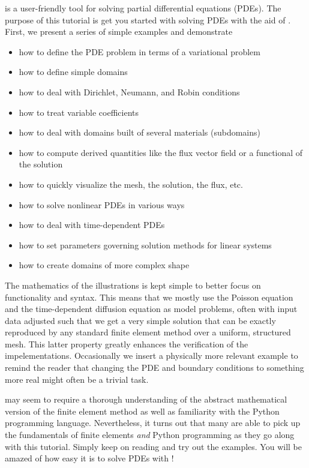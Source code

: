 \fenics{} is a user-friendly tool for solving partial differential
equations (PDEs). The purpose of this tutorial is get you started with
solving PDEs with the aid of \fenics. First, we present a series of
simple examples and demonstrate
\begin{itemize}
\item
how to define the PDE problem in terms of a variational problem
\item
how to define simple domains
\item
how to deal with Dirichlet, Neumann, and Robin conditions
\item
how to treat variable coefficients
\item
how to deal with domains built of several materials (subdomains)
\item
how to compute derived quantities like the flux vector field or
a functional of the solution
\item
how to quickly visualize the mesh, the solution, the flux, etc.
\item
how to solve nonlinear PDEs in various ways
\item
how to deal with time-dependent PDEs
\item
how to set parameters governing solution methods for linear systems
\item
how to create domains of more complex shape
\end{itemize}
The mathematics of the illustrations is kept simple to better focus
on \fenics{} functionality and syntax. This means that we mostly use
the Poisson equation and the time-dependent diffusion equation
as model problems, often with input data adjusted such that we get
a very simple solution that can be exactly reproduced by any standard
finite element method over a uniform, structured mesh. This
latter property greatly enhances the verification of the impelementations.
Occasionally we insert a physically more relevant example
to remind the reader that changing the PDE and boundary
conditions to something more real might often be a trivial task.


\fenics{} may seem to require a thorough understanding of the abstract
mathematical version of the finite element method as well as
familiarity with the Python programming language.  Nevertheless, it
turns out that many are able to pick up the fundamentals of finite
elements \emph{and} Python programming as they go along with this
tutorial. Simply keep on reading and try out the examples. You will be
amazed of how easy it is to solve PDEs with \fenics!

